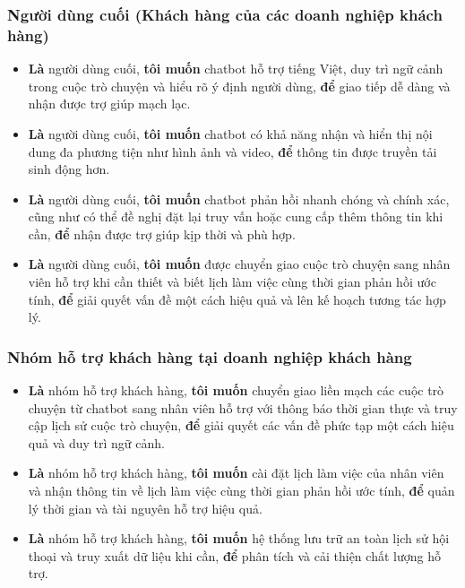 \subsubsection{Người dùng cuối (Khách hàng của các doanh nghiệp khách hàng)}
\begin{itemize}
    \item \textbf{Là} người dùng cuối, \textbf{tôi muốn} chatbot hỗ trợ tiếng Việt, duy trì ngữ cảnh trong cuộc trò chuyện và hiểu rõ ý định người dùng, \textbf{để} giao tiếp dễ dàng và nhận được trợ giúp mạch lạc.
    \item \textbf{Là} người dùng cuối, \textbf{tôi muốn} chatbot có khả năng nhận và hiển thị nội dung đa phương tiện như hình ảnh và video, \textbf{để} thông tin được truyền tải sinh động hơn.
    \item \textbf{Là} người dùng cuối, \textbf{tôi muốn} chatbot phản hồi nhanh chóng và chính xác, cũng như có thể đề nghị đặt lại truy vấn hoặc cung cấp thêm thông tin khi cần, \textbf{để} nhận được trợ giúp kịp thời và phù hợp.
    \item \textbf{Là} người dùng cuối, \textbf{tôi muốn} được chuyển giao cuộc trò chuyện sang nhân viên hỗ trợ khi cần thiết và biết lịch làm việc cùng thời gian phản hồi ước tính, \textbf{để} giải quyết vấn đề một cách hiệu quả và lên kế hoạch tương tác hợp lý.
\end{itemize}

\subsubsection{Nhóm hỗ trợ khách hàng tại doanh nghiệp khách hàng}
\begin{itemize}
    \item \textbf{Là} nhóm hỗ trợ khách hàng, \textbf{tôi muốn} chuyển giao liền mạch các cuộc trò chuyện từ chatbot sang nhân viên hỗ trợ với thông báo thời gian thực và truy cập lịch sử cuộc trò chuyện, \textbf{để} giải quyết các vấn đề phức tạp một cách hiệu quả và duy trì ngữ cảnh.
    \item \textbf{Là} nhóm hỗ trợ khách hàng, \textbf{tôi muốn} cài đặt lịch làm việc của nhân viên và nhận thông tin về lịch làm việc cùng thời gian phản hồi ước tính, \textbf{để} quản lý thời gian và tài nguyên hỗ trợ hiệu quả.
    \item \textbf{Là} nhóm hỗ trợ khách hàng, \textbf{tôi muốn} hệ thống lưu trữ an toàn lịch sử hội thoại và truy xuất dữ liệu khi cần, \textbf{để} phân tích và cải thiện chất lượng hỗ trợ.
\end{itemize}

